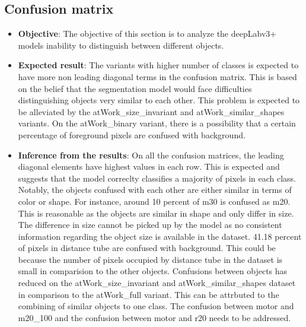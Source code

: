 	\subsection{Confusion matrix}
		\begin{itemize}
			\item \textbf{Objective}: The objective of this section is to analyze the deepLabv3+ models inability to distinguish between different objects. 
			\item \textbf{Expected result}: The variants with higher number of classes is expected to have more non leading diagonal terms in the confusion matrix. This is based on the belief that the segmentation model would face difficulties distinguishing objects very similar to each other. This problem is expected to be alleviated by the atWork\_size\_invariant and atWork\_similar\_shapes variants. On the atWork\_binary variant, there is a possibility that a certain percentage of foreground pixels are confused with background.
			\item \textbf{Inference from the results}: On all the confusion matrices, the leading diagonal elements have highest values in each row. This is expected and suggests that the model correclty classifies a majority of pixels in each class. Notably, the objects confused with each other are either similar in terms of color or shape. For instance, around 10 percent of m30 is confused as m20. This is reasonable as the objects are similar in shape and only differ in size. The difference in size cannot be picked up by the model as no consistent information regarding the object size is available in the dataset. 41.18 percent of pixels in distance tube are confused with background. This could be because the number of pixels occupied by distance tube in the dataset is small in comparision to the other objects.
			Confusions between objects has reduced on the atWork\_size\_invariant and atWork\_similar\_shapes dataset in comparison to the atWork\_full variant. This can be attrbuted to the combining of similar objects to one class. The confusion between motor and m20\_100 and the confusion between motor and r20 needs to be addressed.
		\end{itemize}

